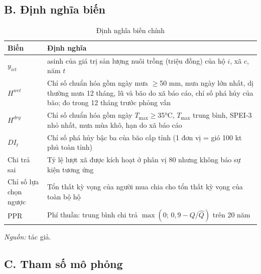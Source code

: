 \documentclass[12pt,a4paper]{article}
\begin{document}
\subsection*{B. Định nghĩa biến}

\begin{table}[!tbp]
\centering\footnotesize
\caption{Định nghĩa biến chính}
\label{tab:vars}
\begin{tabularx}{\textwidth}{@{}>{\raggedright\arraybackslash}p{3.2cm}>{\raggedright\arraybackslash}X@{}}
\toprule
Biến & Định nghĩa \\
\midrule
$y_{ict}$ & asinh của giá trị sản lượng nuôi trồng (triệu đồng) của hộ $i$, xã $c$, năm $t$ \\
$H^{wet}$ & Chỉ số chuẩn hóa gồm ngày mưa $\geq$50 mm, mưa ngày lớn nhất, dị thường mưa 12 tháng, lũ và bão do xã báo cáo, chỉ số phá hủy của bão; đo trong 12 tháng trước phỏng vấn \\
$H^{dry}$ & Chỉ số chuẩn hóa gồm ngày $T_{\max}\geq$35°C, $T_{\max}$ trung bình, SPEI-3 nhỏ nhất, mưa mùa khô, hạn do xã báo cáo \\
$DI_t$ & Chỉ số phá hủy bậc ba của bão cấp tỉnh (1 đơn vị = gió 100 kt phủ toàn tỉnh) \\
Chi trả sai & Tỷ lệ lượt xã được kích hoạt ở phân vị 80 nhưng không báo sự kiện tương ứng \\
Chỉ số lựa chọn ngược & Tổn thất kỳ vọng của người mua chia cho tổn thất kỳ vọng của toàn bộ hộ \\
PPR & Phí thuần: trung bình chi trả $\max(0;\,0{,}9-Q/\hat Q)$ trên 20 năm \\
\bottomrule
\end{tabularx}
\begin{minipage}{\textwidth}\footnotesize
\textit{Nguồn:} tác giả.
\end{minipage}
\end{table}

\subsection*{C. Tham số mô phỏng}
\end{document}
